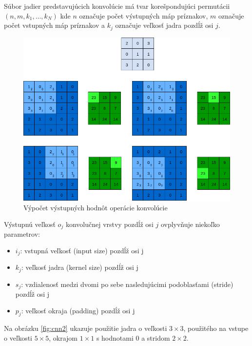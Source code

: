 \indent Súbor jadier predstavujúcich konvolúcie má tvar korešpondujúci permutácii $(n, m, k_{1}, \dots, k_{N})$ kde $n$ označuje počet výstupných máp príznakov, $m$ označuje počet vstupných máp príznakov a $k_{j}$ označuje veľkosť jadra pozdĺž osi $j$.\cite{dumoulin2016guide}

 
\begin{figure}[H]
	\centering
	\includegraphics[width=1\linewidth]{img/cnn1}
	\caption{Výpočet výstupných hodnôt operácie konvolúcie}
	\label{fig:cnn1}
\end{figure}

\indent Výstupnú veľkosť $o_{j}$ konvolučnej vrstvy pozdĺž osi $j$ ovplyvňuje niekoľko parametrov:

\begin{itemize}
	\item $i_{j}$: vstupná veľkosť (input size) pozdĺž osi j
	\item $k_{j}$: veľkosť jadra (kernel size) pozdĺž osi j
	\item $s_{j}$: vzdialenosť medzi dvomi po sebe nasledujúcimi podoblasťami (stride) pozdĺž osi j
	\item $p_{j}$: veľkosť okraja (padding) pozdĺž osi j
\end{itemize}

\indent Na obrázku \ref{fig:cnn2} ukazuje použitie jadra  o veľkosti $3 \times 3$, použitého na vstupe o veľkosti $5 \times 5$, okrajom $1 \times 1$ s hodnotami $0$ a stridom $2 \times 2$.


